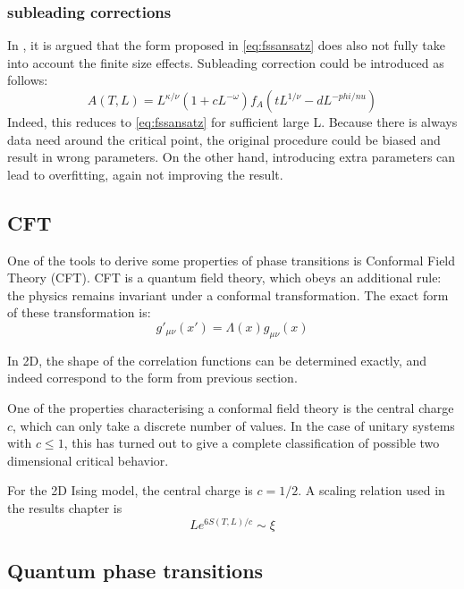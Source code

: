 \subsubsection{subleading corrections}
In \cite{Beach2005}, it is argued that the form proposed in \cref{eq:fssansatz} does also not fully take into account the finite size effects. Subleading correction could be introduced as follows:
\begin{equation}
    A(T,L) = L^{\kappa / \nu} ( 1+c L^{-\omega} ) f_A( t L ^{1/ \nu} -d L^{-phi/nu} )
\end{equation}
Indeed, this reduces to \cref{eq:fssansatz} for sufficient large L. Because there is always data need around the critical point, the original procedure could be biased and result in wrong parameters. On the other hand, introducing extra parameters can lead to overfitting, again not improving the result.

\subsection{CFT}\label{crit:cft}

One of the tools to derive some properties of phase transitions is Conformal Field Theory (CFT). CFT is a quantum field theory, which obeys an additional rule: the physics remains invariant under a conformal transformation. The exact form of these transformation is:
\begin{equation}
    g'_{\mu \nu}(x') = \Lambda(x) g_{\mu \nu}(x)
\end{equation}

In 2D, the shape of the correlation functions can be determined exactly, and indeed correspond to the form from previous section.

One of the properties characterising a conformal field theory is the central charge $c$, which can only take a discrete number of values.  In the case of unitary systems with $c \leq  1$, this has  turned out to give a complete classification of possible two dimensional critical behavior. \cite{Ginsparg1988}

For the 2D Ising model, the central charge is $c=1/2$. A scaling relation used in the results chapter is \cite{Calabrese}
\begin{equation}
    L e^{  6 S( T,L ) /c }  \sim   \xi
\end{equation}

\subsection{Quantum phase transitions}

